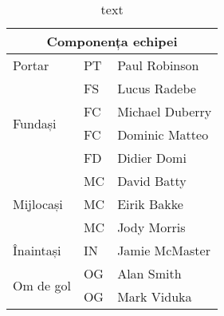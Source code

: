 
\begin{table}[ht!]
	\centering
	\caption{text}
	\begin{latin}
		\begin{tabular}{|l|l|l|}
			\hline \multicolumn{3}{|c|}{Componența echipei} \\ 
			\hline Portar & PT & Paul Robinson \\	  \hline
			\multirow{4}{*}{Fundași} & FS & Lucus Radebe \\ 
			& FC & Michael Duberry \\
			& FC & Dominic Matteo \\ & FD & Didier Domi \\ \hline
			\multirow{3}{*}{Mijlocași} & MC & David Batty \\ 
			& MC & Eirik Bakke \\ & MC & Jody Morris \\ \hline
			Înaintași & IN & Jamie McMaster \\ \hline 
			\multirow{2}{*}{Om de gol} & OG & Alan Smith \\
			& OG & Mark Viduka \\ \hline
		\end{tabular}
	\end{latin}
\end{table}